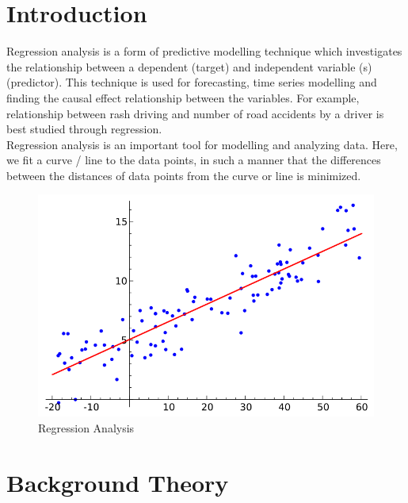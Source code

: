 \documentclass[11pt, a4paper]{report}
\begin{document}
\listoffigures


\newpage

\listoftables

\newpage
\chapter{Introduction}
Regression analysis is a form of predictive modelling technique which investigates the relationship between a dependent (target) and independent variable (s) (predictor). This technique is used for forecasting, time series modelling and finding the causal effect relationship between the variables. For example, relationship between rash driving and number of road accidents by a driver is best studied through regression. 
\\

Regression analysis is an important tool for modelling and analyzing data. Here, we fit a curve / line to the data points, in such a manner that the differences between the distances of data points from the curve or line is minimized.  \cite{desc:RegressionAnalysis}
\\
\begin{figure}[!bth]
	\center
	\includegraphics[scale=0.6]{images/Linear_regression}
	\caption[Regression Analysis]{Regression Analysis \cite{wiki:LinearRegression}}
	\label{fig:regressionanalysis}

\end{figure}
	

\newpage

\chapter{Background Theory}
\end{document}
